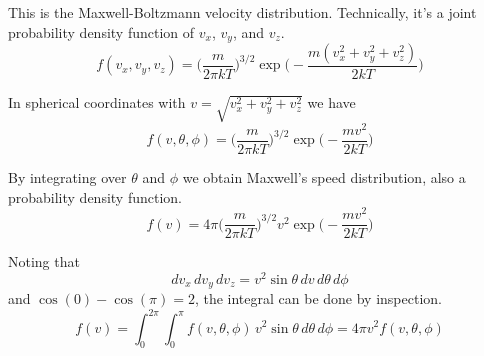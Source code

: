 \documentclass[12pt]{article}
\begin{document}
This is the Maxwell-Boltzmann velocity distribution.
Technically, it's a joint probability density function of $v_x$, $v_y$, and $v_z$.
\begin{equation*}
f(v_x,v_y,v_z)=
\bigg(\frac{m}{2\pi kT}\bigg)^{3/2}
\exp\bigg({-}\frac{m(v_x^2+v_y^2+v_z^2)}{2kT}\bigg)
\end{equation*}

In spherical coordinates with $v=\sqrt{v_x^2+v_y^2+v_z^2}$ we have
\begin{equation*}
f(v,\theta,\phi)=
\bigg(\frac{m}{2\pi kT}\bigg)^{3/2}
\exp\bigg({-}\frac{mv^2}{2kT}\bigg)
\end{equation*}

By integrating over $\theta$ and $\phi$ we obtain Maxwell's speed distribution,
also a probability density function.
\begin{equation*}
f(v)=4\pi\bigg(\frac{m}{2\pi kT}\bigg)^{3/2}
v^2\exp\bigg({-}\frac{mv^2}{2kT}\bigg)
\end{equation*}

Noting that
\begin{equation*}
dv_x\,dv_y\,dv_z=v^2\sin\theta\,dv\,d\theta\,d\phi
\end{equation*}
and $\cos(0)-\cos(\pi)=2$, the integral can be done by inspection.
\begin{equation*}
f(v)=\int_0^{2\pi}\int_0^\pi f(v,\theta,\phi)\,v^2\sin\theta\,d\theta\,d\phi
=4\pi v^2f(v,\theta,\phi)
\end{equation*}
\end{document}
